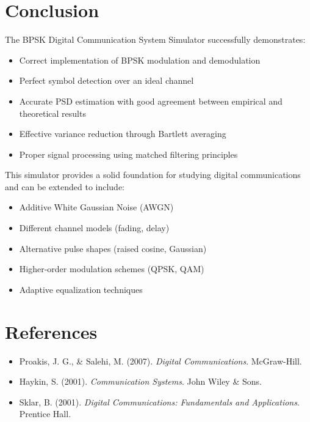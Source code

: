 \documentclass[12pt]{article}
\begin{document}
\section{Conclusion}

The BPSK Digital Communication System Simulator successfully demonstrates:

\begin{itemize}
    \item Correct implementation of BPSK modulation and demodulation
    \item Perfect symbol detection over an ideal channel
    \item Accurate PSD estimation with good agreement between empirical and theoretical results
    \item Effective variance reduction through Bartlett averaging
    \item Proper signal processing using matched filtering principles
\end{itemize}

This simulator provides a solid foundation for studying digital communications and can be extended to include:
\begin{itemize}
    \item Additive White Gaussian Noise (AWGN)
    \item Different channel models (fading, delay)
    \item Alternative pulse shapes (raised cosine, Gaussian)
    \item Higher-order modulation schemes (QPSK, QAM)
    \item Adaptive equalization techniques
\end{itemize}

\section{References}

\begin{itemize}
    \item Proakis, J. G., \& Salehi, M. (2007). \textit{Digital Communications}. McGraw-Hill.
    \item Haykin, S. (2001). \textit{Communication Systems}. John Wiley \& Sons.
    \item Sklar, B. (2001). \textit{Digital Communications: Fundamentals and Applications}. Prentice Hall.
\end{itemize}
\end{document}
